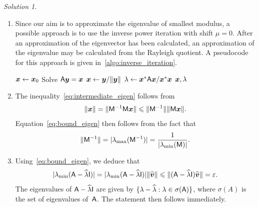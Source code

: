 \documentclass[11pt]{article}
\theoremstyle{definition}
\theoremstyle{remark}
\newtheorem*{solution}{Solution}
\begin{document}
\begin{solution}
    $~$
    \begin{enumerate}
        \item
            Since our aim is to approximate the eigenvalue of smallest modulus,
            a possible approach is to use the inverse power iteration with shift $\mu = 0$.
            After an approximation of the eigenvector has been calculated,
            an approximation of the eigenvalue may be calculated from the Rayleigh quotient.
            A pseudocode for this approach is given in~\cref{algo:inverse_iteration}.
            \begin{algorithm}
                \caption{Inverse iteration}%
                \label{algo:inverse_iteration}%
                \begin{algorithmic}
                    \State $\mathbf{\boldsymbol{x}} \gets \mathbf{\boldsymbol{x}}_0$
                    \State Solve $\mathsf A \mathbf{\boldsymbol{y}} = \mathbf{\boldsymbol{x}}$
                    \State $\mathbf{\boldsymbol{x}} \gets \mathbf{\boldsymbol{y}} / \lVert\mathbf{\boldsymbol{y}}\rVert$
                    \EndFor
                    \State $\lambda \gets \mathbf{\boldsymbol{x}}^* \mathsf A \mathbf{\boldsymbol{x}} / \mathbf{\boldsymbol{x}}^* \mathbf{\boldsymbol{x}}$
                    \State \Return $\mathbf{\boldsymbol{x}}, \lambda$
                \end{algorithmic}
            \end{algorithm}

        \item
            The inequality~\eqref{eq:intermediate_eigen} follows from
            \[
                \lVert\mathbf{\boldsymbol{x}}\rVert = \lVert\mathsf M^{-1} \mathsf M \mathbf{\boldsymbol{x}}\rVert \leqslant \lVert\mathsf M^{-1}\rVert \lVert\mathsf M \mathbf{\boldsymbol{x}}\rVert.
            \]
            Equation~\eqref{eq:bound_eigen} then follows from the fact that
            \begin{equation}
                \label{eq:norm_inverse}
                \lVert\mathsf M^{-1}\rVert = \lvert\lambda_{\max}(\mathsf M^{-1})\rvert = \frac{1}{\lvert\lambda_{\min}(\mathsf M)\rvert}.
            \end{equation}

        \item
            Using~\eqref{eq:bound_eigen},
            we deduce that
            \[
                \lvert\lambda_{\min}(\mathsf A - \widehat \lambda \mathsf I)\rvert =
                \lvert\lambda_{\min}(\mathsf A - \widehat \lambda \mathsf I)\rvert \lVert\widehat {\mathbf{\boldsymbol{v}}}\rVert
                \leqslant \lVert(\mathsf A - \widehat \lambda \mathsf I) \widehat {\mathbf{\boldsymbol{v}}}\rVert = \varepsilon.
            \]
            The eigenvalues of $\mathsf A - \widehat \lambda \mathsf I$ are given by $\{\lambda - \widehat \lambda : \lambda \in \sigma(\mathsf A)\}$,
            where $\sigma(A)$ is the set of eigenvalues of~$\mathsf A$.
            The statement then follows immediately.


\end{enumerate}
\end{solution}
\end{document}
